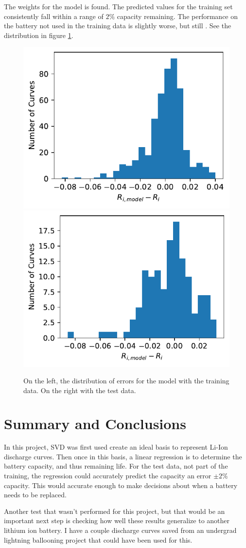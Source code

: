 \documentclass{article}
\begin{document}
    The weights for the model is found. The predicted values for the training
    set consistently fall within a range of $2 \%$ capacity remaining. The
    performance on the battery not used in the training data is slightly worse,
    but still . See the distribution in figure \ref{fig:model_dist}.

    \begin{figure}[tbp]
        \centering
        \includegraphics[width=.48\textwidth]{train-pref.pdf}
        \includegraphics[width=.48\textwidth]{test-pref.pdf}
        \caption{\label{fig:model_dist} On the left, the distribution of
        errors for the model with the training data. On the right with the
        test data.}
    \end{figure}

    \section{Summary and Conclusions}
    In this project, SVD was first used create an ideal basis to represent
    Li-Ion discharge curves. Then once in this basis, a linear regression is
    to determine the battery capacity, and thus remaining life. For the test
    data, not part of the training, the regression could accurately predict the
    capacity an error $\pm 2 \% $ capacity. This would accurate enough to make
    decisions about when a battery needs to be replaced.

    Another test that wasn't performed for this project, but that would be an
    important next step is checking how well these results generalize to
    another lithium ion battery. I have a couple discharge curves saved from
    an undergrad lightning ballooning project that could have been used for
    this.
    
\end{document}
